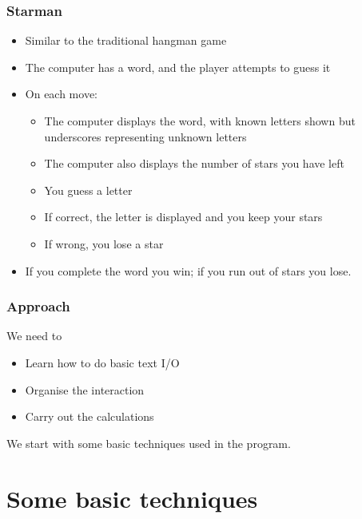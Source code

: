 \documentclass{beamer}
\begin{document}
\begin{frame}[fragile]
\frametitle{Starman}

\begin{itemize}
\item Similar to the traditional hangman game
\item The computer has a word, and the player attempts to guess it
\item On each move:
  \begin{itemize}
  \item The computer displays the word, with known letters shown
    but underscores representing unknown letters
  \item The computer also displays the number of stars you have left
  \item You guess a letter
  \item If correct, the letter is displayed and you keep your stars
  \item If wrong, you lose a star
  \end{itemize}
\item If you complete the word you win; if you run out of stars you
  lose.
\end{itemize}
\end{frame}

\begin{frame}[fragile]
\frametitle{Approach}

We need to
\begin{itemize}
\item Learn how to do basic text I/O
\item Organise the interaction
\item Carry out the calculations
\end{itemize}

We start with some basic techniques used in the program.

\end{frame}

\section{Some basic techniques}

\end{document}
